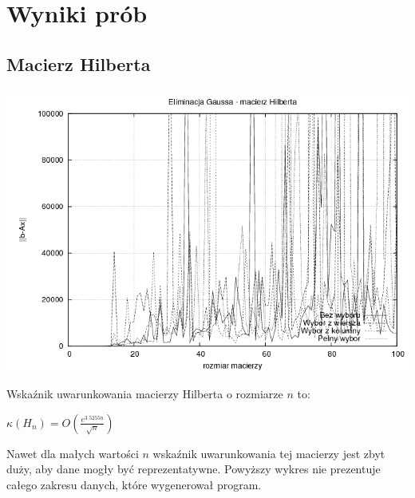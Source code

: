 \documentclass[a4paper,10pt]{article}
\begin{document}
\section{Wyniki prób}
    \subsection{Macierz Hilberta}
        \begin{center}
            \includegraphics[width=140mm]{hilbert_plot.png}
        \end{center}
        Wskaźnik uwarunkowania macierzy Hilberta o rozmiarze $n$ to:
        \begin{center}
            $ \kappa(H_{n}) = O(\frac{e^{3.5255n}}{\sqrt{n}})$
        \end{center}
            Nawet dla małych wartości $n$ wskaźnik uwarunkowania tej macierzy jest zbyt duży, aby dane mogły być reprezentatywne. Powyższy wykres nie prezentuje całego zakresu danych, które wygenerował program.
\end{document}
